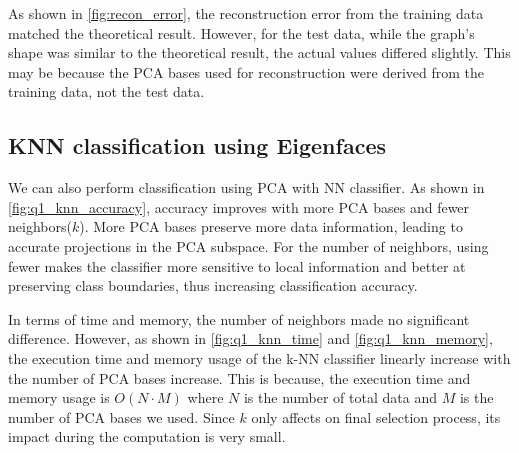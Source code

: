 As shown in \cref{fig:recon_error}, the reconstruction error from the training data matched the theoretical result. However, for the test data, while the graph’s shape was similar to the theoretical result, the actual values differed slightly. This may be because the PCA bases used for reconstruction were derived from the training data, not the test data.

\vspace{-0.5cm}
\subsection{KNN classification using Eigenfaces}

We can also perform classification using PCA with NN classifier. As shown in \cref{fig:q1_knn_accuracy}, accuracy improves with more PCA bases and fewer neighbors($k$). More PCA bases preserve more data information, leading to accurate projections in the PCA subspace. For the number of neighbors, using fewer makes the classifier more sensitive to local information and better at preserving class boundaries, thus increasing classification accuracy.

In terms of time and memory, the number of neighbors made no significant difference. However, as shown in \cref{fig:q1_knn_time} and \cref{fig:q1_knn_memory}, the execution time and memory usage of the k-NN classifier linearly increase  with the number of PCA bases increase. This is because, the execution time and memory usage is $O(N\cdot M)$ where $N$ is the number of total data and $M$ is the number of PCA bases we used. Since $k$ only affects on final selection process, its impact during the computation is very small.


